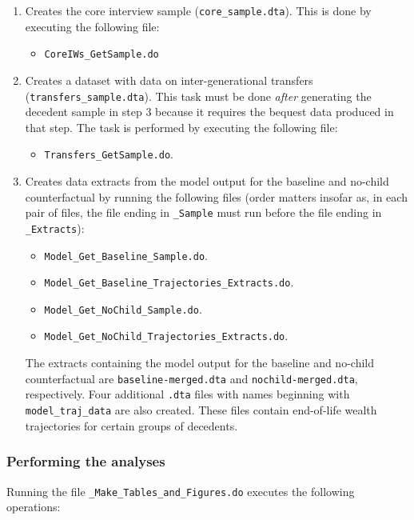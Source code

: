 \documentclass[a4,12p]{article}
\begin{document}
\begin{enumerate}
\item
Creates the core interview sample ({\tt core\_sample.dta}). This is done by executing the following file:
\begin{itemize} 
  \item {\tt CoreIWs\_GetSample.do}
\end{itemize}

\item
Creates a dataset with data on inter-generational transfers ({\tt transfers\_sample.dta}). This task must be done \emph{after} generating the decedent sample in step 3 because it requires the bequest data produced in that step. The task is performed by executing the following file:
\begin{itemize} 
  \item {\tt Transfers\_GetSample.do}.
\end{itemize}

\item
Creates data extracts from the model output for the baseline and no-child counterfactual by running the following files (order matters insofar as, in each pair of files, the file ending in {\tt \_Sample} must run before the file ending in {\tt \_Extracts}):
\begin{itemize}
\item {\tt Model\_Get\_Baseline\_Sample.do}.
\item {\tt Model\_Get\_Baseline\_Trajectories\_Extracts.do}.
\item {\tt Model\_Get\_NoChild\_Sample.do}.
\item {\tt Model\_Get\_NoChild\_Trajectories\_Extracts.do}.
\end{itemize}
The extracts containing the model output for the baseline and no-child counterfactual are {\tt baseline-merged.dta} and {\tt nochild-merged.dta}, respectively. Four additional {\tt .dta} files with names beginning with {\tt model\_traj\_data} are also created. These files contain end-of-life wealth trajectories for certain groups of decedents.

\end{enumerate}

\subsubsection{Performing the analyses}

Running the file {\tt \_Make\_Tables\_and\_Figures.do} executes the following operations:
\end{document}
